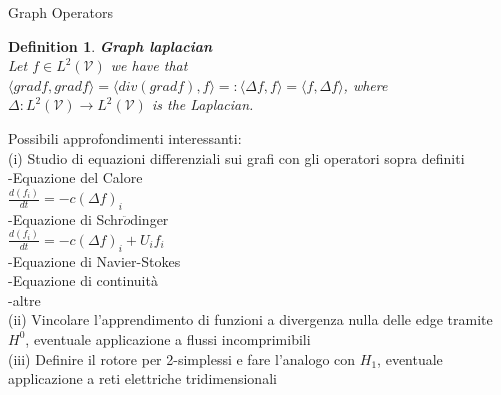 \documentclass{article}
\newtheorem{defn}{Definition}[section]
\newcommand{\bb}[1]{\textbf{#1}}
\newcommand{\scal}[2]{\langle #1 , #2 \rangle}
\newcommand{\mc}{\mathcal}
\begin{document}
\begin{section}{Graph Operators}
    
        \begin{defn}
	    \bb{Graph laplacian}\\
	    Let $f \in L^2(\mc{V})$ we have that $\scal{gradf}{gradf} = \scal{div(gradf)}{f} =: \scal{\Delta f}{f} = \scal{f}{\Delta f}$, where
	    $\Delta : L^2(\mc{V}) \to L^2(\mc{V})$ is the Laplacian.
	\end{defn}

	Possibili approfondimenti interessanti:\\
	(i)   Studio di equazioni differenziali sui grafi con gli operatori sopra definiti\\
	      -Equazione del Calore\\
	      $\frac{d(f_i)}{dt} = -c(\Delta f)_i$\\
	      -Equazione di Schr$\ddot{o}$dinger\\
	      $\frac{d(f_i)}{dt} = -c(\Delta f)_i + U_i f_i$\\
	      -Equazione di Navier-Stokes\\
	      -Equazione di continuità\\
	      -altre\\
	(ii)  Vincolare l'apprendimento di funzioni a divergenza nulla delle edge tramite $H^0$, eventuale applicazione a flussi incomprimibili\\
	(iii) Definire il rotore per 2-simplessi e fare l'analogo con $H_1$, eventuale applicazione a reti elettriche tridimensionali\\

    \end{section}
\end{document}
